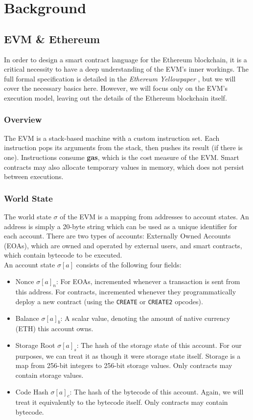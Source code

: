 \chapter{Background}\label{ch:background}

\section{EVM \& Ethereum}

In order to design a smart contract language for the Ethereum blockchain, it is a critical necessity to have a deep understanding of the EVM's inner workings. The full formal specification is detailed in the \textit{Ethereum Yellowpaper} \cite{yellowpaper}, but we will cover the necessary basics here. However, we will focus only on the EVM's execution model, leaving out the details of the Ethereum blockchain itself.

\subsection{Overview}
The EVM is a stack-based machine with a custom instruction set. Each instruction pops its arguments from the stack, then pushes its result (if there is one). Instructions consume \textbf{gas}, which is the cost measure of the EVM. Smart contracts may also allocate temporary values in memory, which does not persist between executions.

\subsection{World State}
The world state $\sigma$ of the EVM is a mapping from addresses to account states. An address is simply a 20-byte string which can be used as a unique identifier for each account. There are two types of accounts: Externally Owned Accounts (EOAs), which are owned and operated by external users, and smart contracts, which contain bytecode to be executed. \\
An account state $\sigma[a]$ consists of the following four fields:
\begin{itemize}
  \item Nonce $\sigma[a]_n$: For EOAs, incremented whenever a transaction is sent from this address. For contracts, incremented whenever they programmatically deploy a new contract (using the \lstinline{CREATE} or \lstinline{CREATE2} opcodes).
  \item Balance $\sigma[a]_b$: A scalar value, denoting the amount of native currency (ETH) this account owns.
  \item Storage Root $\sigma[a]_s$: The hash of the storage state of this account. For our purposes, we can treat it as though it were storage state itself. Storage is a map from 256-bit integers to 256-bit storage values. Only contracts may contain storage values.
  \item Code Hash $\sigma[a]_c$: The hash of the bytecode of this account. Again, we will treat it equivalently to the bytecode itself. Only contracts may contain bytecode.
\end{itemize}

